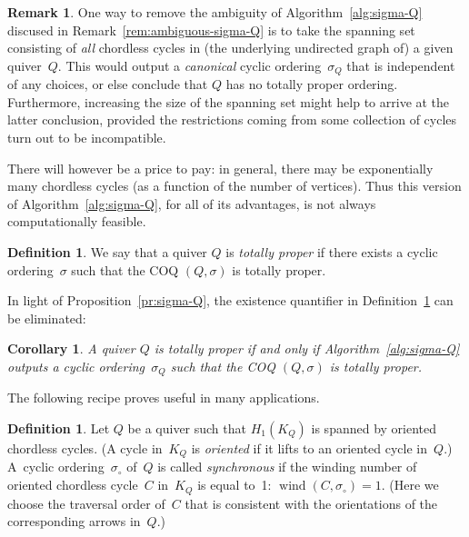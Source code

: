 \documentclass[11pt, letterpaper]{amsart}
\newtheorem{corollary}[theorem]{Corollary}
\theoremstyle{definition}
\newtheorem{remark}[theorem]{Remark}
\newtheorem{definition}[theorem]{Definition}
\numberwithin{equation}{section}
\def\wind{{\operatorname{wind}}}
\newcommand\GQ{K_Q}
\begin{document}
\begin{remark}
\label{rem:construct proper}
One way to remove the ambiguity of Algorithm~\ref{alg:sigma-Q} discused in Remark~\ref{rem:ambiguous-sigma-Q} is to 
take the spanning set consisting of \emph{all} chordless cycles in (the underlying undirected graph of)
a given quiver~$Q$. 
This would output a \emph{canonical} cyclic ordering~$\sigma_Q$ that is independent of any choices, 
or else conclude that $Q$ has no totally proper ordering. 
Furthermore, increasing the size of the spanning set might help to arrive at the latter conclusion,  
provided the restrictions coming from some collection of cycles turn out to be incompatible. 

There will however be a price to pay: 
in general, there may be exponentially many chordless cycles (as a function of the number of vertices). 
Thus this version of Algorithm~\ref{alg:sigma-Q}, for all of its advantages, 
is not always computationally feasible.
\end{remark}



\begin{definition}
\label{def:TP-Q}
We say that a quiver $Q$ is \emph{totally proper} 
if there exists a cyclic ordering~$\sigma$ such that the COQ $(Q,\sigma)$ is totally proper. 
\end{definition}

In light of Proposition~\ref{pr:sigma-Q}, the existence quantifier in Definition~\ref{def:TP-Q} can be eliminated: 

\begin{corollary}
A quiver $Q$ is totally proper if and only if Algorithm~\ref{alg:sigma-Q} outputs a cyclic ordering~$\sigma_Q$
such that the COQ $(Q,\sigma)$ is totally proper. 
\end{corollary}

The following recipe proves useful in many applications.

\begin{definition}
\label{def:sigma ori}
Let $Q$ be a quiver such that $H_1(\GQ)$ is spanned by oriented chord\-less cycles.   
(A cycle in~$\GQ$ is \emph{oriented} if it lifts to an oriented cycle in~$Q$.) 
A~cyclic ordering~$\sigma_\circ$ of~$Q$ is called \emph{synchronous} if 
the winding number of  oriented chordless cycle~$C$ in~$\GQ$
is equal to~1: $\wind(C, \sigma_\circ)=1$. 
(Here we choose the traversal order of~$C$ that is consistent with the orientations of the corresponding arrows in~$Q$.) 
\end{definition}
\end{document}

